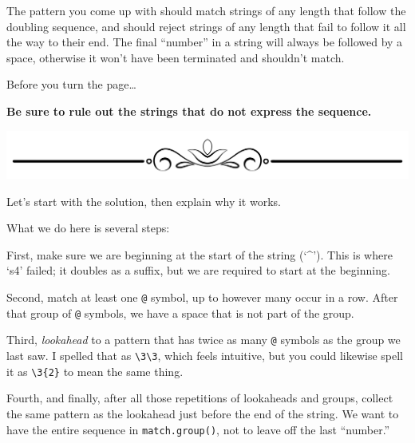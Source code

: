 \newpage

The pattern you come up with should match strings of any length that
follow the doubling sequence, and should reject strings of any length
that fail to follow it all the way to their end. The final ``number'' in
a string will always be followed by a space, otherwise it won't have
been terminated and shouldn't match.

Before you turn the page\ldots{}

\textbf{Be sure to rule out the strings that do not express the
sequence.}

\includegraphics{images/Elegant-Flourish-Frame-Extrapolated-19.svg}

\newpage

Let's start with the solution, then explain why it works.

\begin{Shaded}
\begin{Highlighting}[]
\OperatorTok{=} 
\end{Highlighting}
\end{Shaded}

What we do here is several steps:

First, make sure we are beginning at the start of the string (`\^{}').
This is where `s4' failed; it doubles as a suffix, but we are required
to start at the beginning.

Second, match at least one \texttt{@} symbol, up to however many occur
in a row. After that group of \texttt{@} symbols, we have a space that
is not part of the group.

Third, \emph{lookahead} to a pattern that has twice as many \texttt{@}
symbols as the group we last saw. I spelled that as
\texttt{\textbackslash{}3\textbackslash{}3}, which feels intuitive, but
you could likewise spell it as \texttt{\textbackslash{}3\{2\}} to mean
the same thing.

Fourth, and finally, after all those repetitions of lookaheads and
groups, collect the same pattern as the lookahead just before the end of
the string. We want to have the entire sequence in
\texttt{match.group()}, not to leave off the last ``number.''

